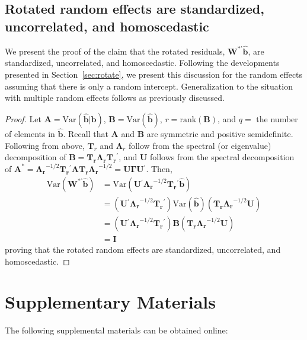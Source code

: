 \documentclass[12pt]{article} %
\newcommand{\trans}{\ensuremath{^\prime}}
\newcommand{\var}{\ensuremath{\mathrm{Var}}}
\begin{document}
\subsection{Rotated random effects are standardized, uncorrelated, and homoscedastic}

We present the proof of the claim that the rotated residuals, $\bm{W}^{*\prime} \widehat{\bm{b}}$, are standardized, uncorrelated, and homoscedastic. Following the developments presented in Section~\ref{sec:rotate}, we present this discussion for the random effects assuming that there is only a random intercept. Generalization to the situation with multiple random effects follows as previously discussed.

\begin{proof}
 Let $\bm{A} = \var(\widehat{\bm{b}} | \bm{b})$, $\bm{B} = \var(\widehat{\bm{b}})$, $r = \text{rank}(\bm{B})$, and $q = $ the number of elements in $\widehat{\bm{b}}$. Recall that $\bm{A}$ and $\bm{B}$ are symmetric and positive semidefinite. Following from above, $\bm{T}_r$ and $\bm{\Lambda}_r$ follow from the spectral (or eigenvalue) decomposition of $\bm{B} = \bm{T_r \Lambda_r T_r}\trans$, and $\bm{U}$ follows from the spectral decomposition of $\bm{A^*} = \bm{\Lambda_r}^{-1/2} \bm{T_r}\trans \bm{A T_r \Lambda_r}^{-1/2} = \bm{U} \bm{\Gamma} \bm{U}\trans$. Then, 
\begin{align*}
\var(\bm{W}^{*\prime} \widehat{\bm{b}}) &= \var(\bm{U}\trans \bm{\Lambda_r}^{-1/2} \bm{T_r}\trans \widehat{\bm{b}})\\
&= (\bm{U}\trans \bm{\Lambda_r}^{-1/2} \bm{T_r}\trans) \var(\widehat{\bm{b}}) (\bm{T_r \Lambda_r}^{-1/2} \bm{U})\\
&= (\bm{U}\trans \bm{\Lambda_r}^{-1/2} \bm{T_r}\trans) \bm{B} (\bm{T_r \Lambda_r}^{-1/2} \bm{U})\\
&= \bm{I}
\end{align*}
proving that the rotated random effects are standardized, uncorrelated, and homoscedastic.
\end{proof}


\section*{Supplementary Materials}

The following supplemental materials can be obtained online:
\end{document}
